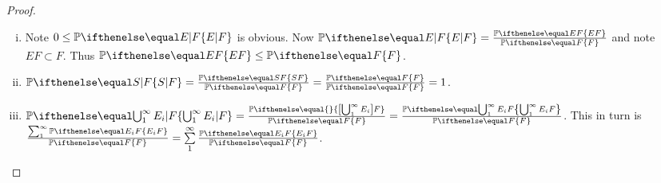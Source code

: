 \documentclass[a4paper,11pt]{article}
\begin{document}
\begin{outline}
    \begin{proof}
      \begin{enumerate}[i.]
        \item
          Note \(0 \leq \bbp[E|F]\) is obvious. Now \(\bbp[E|F] = \frac{\bbp[EF]}{\bbp[F]}\) and note
          \(EF \subset F\). Thus \(\bbp[EF] \leq \bbp[F]\).
        \item
          \(\bbp[S|F] = \frac{\bbp[SF]}{\bbp[F]} = \frac{\bbp[F]}{\bbp[F]} = 1\).
        \item
          \(\bbp[\bigcup_{1}^{\infty} E_i|F] = \frac{\bbp\{\left[\bigcup_{1}^{\infty} E_i\right]F\}}{\bbp[F]}
          = \frac{\bbp[\bigcup_{1}^{\infty}E_iF]}{\bbp[F]}\). This in turn is
          \(\frac{\sum_{1}^{\infty} \bbp[E_iF]}{\bbp[F]} = \sum\limits_{1}^{\infty} \frac{\bbp[E_iF]}{\bbp[F]}\).
      \end{enumerate}
    \end{proof}
\end{outline}
\end{document}
